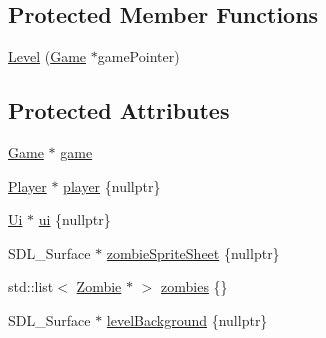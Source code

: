 \subsection*{Protected Member Functions}
\begin{DoxyCompactItemize}
\item 
\hyperlink{classLevel_a0af6f93b99224d07a5eefb0c73df20b1}{Level} (\hyperlink{classGame}{Game} $\ast$game\-Pointer)
\end{DoxyCompactItemize}
\subsection*{Protected Attributes}
\begin{DoxyCompactItemize}
\item 
\hyperlink{classGame}{Game} $\ast$ \hyperlink{classLevel_acefd7bcf714862644a1c7f6ab0462fe4}{game}
\item 
\hyperlink{classPlayer}{Player} $\ast$ \hyperlink{classLevel_a76b010ccc524cef1ae0c3adc2a63d3b1}{player} \{nullptr\}
\item 
\hyperlink{classUi}{Ui} $\ast$ \hyperlink{classLevel_aefdedc06660278bcea9e0d06460af308}{ui} \{nullptr\}
\item 
S\-D\-L\-\_\-\-Surface $\ast$ \hyperlink{classLevel_af0f53f17e06a467013d4612c13bbdc68}{zombie\-Sprite\-Sheet} \{nullptr\}
\item 
std\-::list$<$ \hyperlink{classZombie}{Zombie} $\ast$ $>$ \hyperlink{classLevel_a507f4b9bc3a1b4acf67c8857a942f584}{zombies} \{\}
\item 
S\-D\-L\-\_\-\-Surface $\ast$ \hyperlink{classLevel_a0016c5498bfdf767cf58bd36d5b1e8c0}{level\-Background} \{nullptr\}
\end{DoxyCompactItemize}


